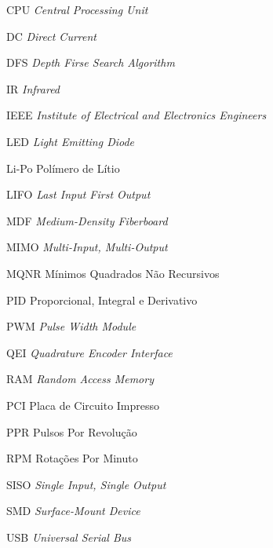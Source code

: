 \clearpage
{} %
\listoffigures*

\clearpage
{} %
\listoftables*

\clearpage
\renewcommand{\listadesiglasname}{Lista de siglas e abreviaturas}
\begin{siglas}
	\item[CPU] \textit{Central Processing Unit}
	\item[DC] \textit{Direct Current}
	\item[DFS] \textit{Depth Firse Search Algorithm}
	\item[IR] \textit{Infrared}
	\item[IEEE] \textit{Institute of Electrical and Electronics Engineers}
	\item[LED] \textit{Light Emitting Diode}
	\item[Li-Po] Polímero de Lítio
	\item[LIFO] \textit{Last Input First Output}
	\item[MDF] \textit{Medium-Density Fiberboard}
	\item[MIMO] \textit{Multi-Input, Multi-Output}
	\item[MQNR] Mínimos Quadrados Não Recursivos
	\item[PID] Proporcional, Integral e Derivativo
	\item[PWM] \textit{Pulse Width Module}
	\item[QEI] \textit{Quadrature Encoder Interface}
	\item[RAM] \textit{Random Access Memory}
	\item[PCI] Placa de Circuito Impresso
	\item[PPR] Pulsos Por Revolução
	\item[RPM] Rotações Por Minuto
	\item[SISO] \textit{Single Input, Single Output}
	\item[SMD] \textit{Surface-Mount Device}
	\item[USB] \textit{Universal Serial Bus}
\end{siglas}

\clearpage
{} %
\tableofcontents*

\label{LastPreContentPage}

\clearpage
